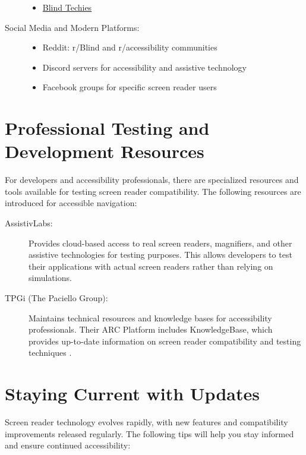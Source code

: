 \begin{description}
\begin{itemize}
		      \item \href{https://groups.io/g/blind-techies/}{Blind Techies}
	      \end{itemize}
	\item[Social Media and Modern Platforms:]
	      \begin{itemize}
		      \item Reddit: r/Blind and r/\gls{accessibility} communities
		      \item Discord servers for accessibility and assistive technology
		      \item Facebook groups for specific screen reader users
	      \end{itemize}
\end{description}

\section{Professional Testing and Development Resources}
\label{app1:testing}
For developers and accessibility professionals, there are specialized resources and tools available for testing screen reader compatibility. The following resources are introduced for accessible \gls{navigation}:

\begin{description}
	\item[AssistivLabs:] Provides cloud-based access to real screen readers, magnifiers, and other assistive technologies for testing purposes. This allows developers to test their applications with actual screen readers rather than relying on simulations.
	\item[TPGi (The Paciello Group):] Maintains technical resources and knowledge bases for accessibility professionals. Their ARC Platform includes KnowledgeBase, which provides up-to-date information on screen reader compatibility and testing techniques \cite{TPGiARC}.
\end{description}

\section{Staying Current with Updates}
\label{app1:updates}
Screen reader technology evolves rapidly, with new features and compatibility improvements released regularly. The following tips will help you stay informed and ensure continued accessibility:

